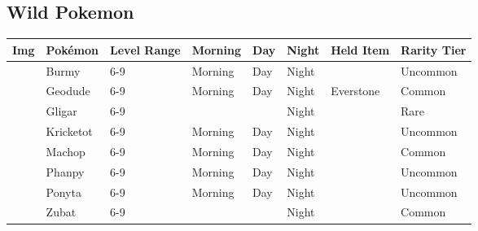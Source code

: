 \subsection{Wild Pokemon}%
\label{subsec:WildPokemon}%
\begin{longtable}{||l l l l l l l l||}%
\hline%
Img&Pokémon&Level Range&Morning&Day&Night&Held Item&Rarity Tier\\%
\hline%
\endhead%
\hline%
&Burmy&6{-}9&Morning&Day&Night&&Uncommon\\%
\hline%
&Geodude&6{-}9&Morning&Day&Night&Everstone&Common\\%
\hline%
&Gligar&6{-}9&&&Night&&Rare\\%
\hline%
&Kricketot&6{-}9&Morning&Day&Night&&Uncommon\\%
\hline%
&Machop&6{-}9&Morning&Day&Night&&Common\\%
\hline%
&Phanpy&6{-}9&Morning&Day&Night&&Uncommon\\%
\hline%
&Ponyta&6{-}9&Morning&Day&Night&&Uncommon\\%
\hline%
&Zubat&6{-}9&&&Night&&Common\\%
\hline%
\end{longtable}